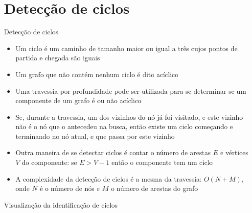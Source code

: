 \section{Detecção de ciclos}

\begin{frame}[fragile]{Detecção de ciclos}

    \begin{itemize}
        \item Um ciclo é um caminho de tamanho maior ou igual a três cujos pontos de partida e 
            chegada são iguais

        \item Um grafo que não contém nenhum ciclo é dito acíclico

        \item Uma travessia por profundidade pode ser utilizada para se determinar se um
            componente de um grafo é ou não acíclico

        \item Se, durante a travessia, um dos vizinhos do nó já foi visitado, e este vizinho 
            não é o nó que o antecedeu na busca, então existe um ciclo começando e terminando
            no nó atual, e que passa por este vizinho

        \item Outra maneira de se detectar ciclos é contar o número de arestas $E$ e vértices $V$ do
            componente: se $E > V - 1$ então o componente tem um ciclo

        \item A complexidade da detecção de ciclos é a mesma da travessia: $O(N + M)$, onde $N$
            é o número de nós e $M$ o número de arestas do grafo
    \end{itemize}

\end{frame}

\begin{frame}[fragile]{Visualização da identificação de ciclos}


\end{frame}

